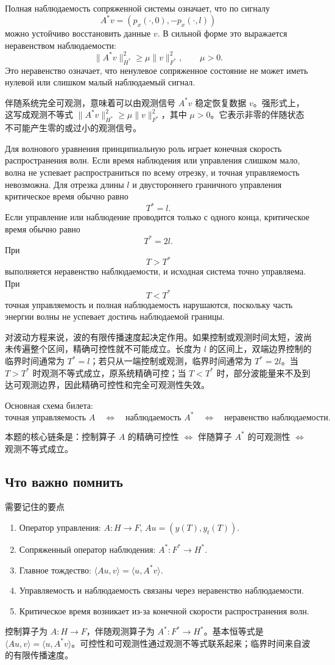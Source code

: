 \documentclass[12pt,a4paper]{article}
\newcommand{\zh}[1]{\par\noindent #1\par}
\begin{document}
Полная наблюдаемость сопряженной системы означает, что по сигналу
\[
 A^*v=(p_x(\cdot,0),-p_x(\cdot,l))
\]
можно устойчиво восстановить данные $v$. В сильной форме это выражается неравенством наблюдаемости:
\[
 \|A^*v\|_{H^*}^2\ge \mu \|v\|_{F^*}^2,
 \qquad \mu>0.
\]
Это неравенство означает, что ненулевое сопряженное состояние не может иметь нулевой или слишком малый наблюдаемый сигнал.
\zh{伴随系统完全可观测，意味着可以由观测信号 \(A^*v\) 稳定恢复数据 \(v\)。强形式上，这写成观测不等式 \(\|A^*v\|_{H^*}^2\ge \mu\|v\|_{F^*}^2\)，其中 \(\mu>0\)。它表示非零的伴随状态不可能产生零的或过小的观测信号。}


Для волнового уравнения принципиальную роль играет конечная скорость распространения волн. Если время наблюдения или управления слишком мало, волна не успевает распространиться по всему отрезку, и точная управляемость невозможна. Для отрезка длины $l$ и двустороннего граничного управления критическое время обычно равно
\[
 T^*=l.
\]
Если управление или наблюдение проводится только с одного конца, критическое время обычно равно
\[
 T^*=2l.
\]
При
\[
 T>T^*
\]
выполняется неравенство наблюдаемости, и исходная система точно управляема. При
\[
 T<T^*
\]
точная управляемость и полная наблюдаемость нарушаются, поскольку часть энергии волны не успевает достичь наблюдаемой границы.
\zh{对波动方程来说，波的有限传播速度起决定作用。如果控制或观测时间太短，波尚未传遍整个区间，精确可控性就不可能成立。长度为 \(l\) 的区间上，双端边界控制的临界时间通常为 \(T^*=l\)；若只从一端控制或观测，临界时间通常为 \(T^*=2l\)。当 \(T>T^*\) 时观测不等式成立，原系统精确可控；当 \(T<T^*\) 时，部分波能量来不及到达可观测边界，因此精确可控性和完全可观测性失效。}

Основная схема билета:
\[
 \text{точная управляемость } A
 \quad\Longleftrightarrow\quad
 \text{наблюдаемость } A^*
 \quad\Longleftrightarrow\quad
 \text{неравенство наблюдаемости}.
\]
\zh{本题的核心链条是：控制算子 \(A\) 的精确可控性 \(\Longleftrightarrow\) 伴随算子 \(A^*\) 的可观测性 \(\Longleftrightarrow\) 观测不等式成立。}

\subsection*{Что важно помнить}
\zh{需要记住的要点}
\begin{enumerate}
\item Оператор управления: $A:H\to F$, $Au=(y(T),y_t(T))$.
\item Сопряженный оператор наблюдения: $A^*:F^*\to H^*$.
\item Главное тождество: $\langle Au,v\rangle=\langle u,A^*v\rangle$.
\item Управляемость и наблюдаемость связаны через неравенство наблюдаемости.
\item Критическое время возникает из-за конечной скорости распространения волн.
\end{enumerate}
\zh{控制算子为 \(A:H\to F\)，伴随观测算子为 \(A^*:F^*\to H^*\)。基本恒等式是 \(\langle Au,v\rangle=\langle u,A^*v\rangle\)。可控性和可观测性通过观测不等式联系起来；临界时间来自波的有限传播速度。}
\end{document}
